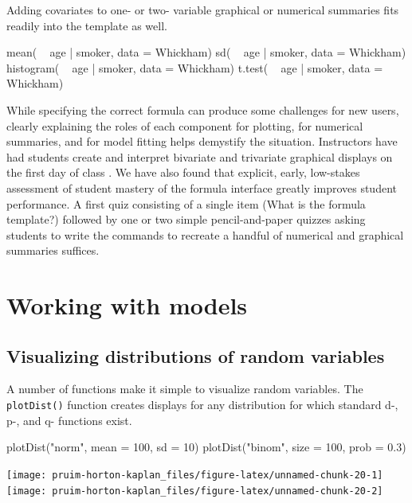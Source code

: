 \noindent
Adding covariates to one- or two- variable graphical or numerical
summaries fits readily into the template as well.

\begin{Schunk}
\begin{Sinput}
     mean( ~ age | smoker, data = Whickham)
       sd( ~ age | smoker, data = Whickham)
histogram( ~ age | smoker, data = Whickham)
   t.test( ~ age | smoker, data = Whickham)
\end{Sinput}
\end{Schunk}

While specifying the correct formula can produce some challenges for new
users, clearly explaining the roles of each component for plotting, for
numerical summaries, and for model fitting helps demystify the
situation. Instructors have had students create and interpret bivariate
and trivariate graphical displays on the first day of class
\citep{Wang:USCOTS:2015}. We have also found that explicit, early,
low-stakes assessment of student mastery of the formula interface
greatly improves student performance. A first quiz consisting of a
single item (What is the formula template?) followed by one or two
simple pencil-and-paper quizzes asking students to write the commands to
recreate a handful of numerical and graphical summaries suffices.

\section{Working with models}\label{working-with-models}

\subsection{Visualizing distributions of random
variables}\label{visualizing-distributions-of-random-variables}

A number of functions make it simple to visualize random variables. The
\texttt{plotDist()} function creates displays for any distribution for
which standard d-, p-, and q- functions exist.

\begin{Schunk}
\begin{Sinput}
plotDist("norm", mean = 100, sd = 10)
plotDist("binom", size = 100, prob = 0.3)
\end{Sinput}


\begin{center}\texttt{[image: pruim-horton-kaplan\_files/figure-latex/unnamed-chunk-20-1]} \texttt{[image: pruim-horton-kaplan\_files/figure-latex/unnamed-chunk-20-2]} \end{center}

\end{Schunk}

